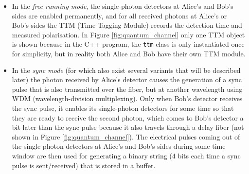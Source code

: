 \begin{itemize}

\item In the \textit{free running mode}, the single-photon detectors at Alice's and Bob's sides are enabled permanently, and for all received photons at Alice's or Bob's sides the TTM (Time Tagging Module) records the detection time and measured polarisation. In Figure \ref{fig:quantum_channel} only one TTM object is shown because in the C++ program, the \texttt{ttm} class is only instantiated once for simplicity, but in reality both Alice and Bob have their own TTM module.

\item In the \textit{sync mode} (for which also exist several variants that will be described later) the photon received by Alice's detector causes the generation of a sync pulse that is also transmitted over the fiber, but at another wavelength using WDM (wavelength-division multiplexing). Only when Bob's detector receives the sync pulse, it enables its single-photon detectors for some time so that they are ready to receive the second photon, which comes to Bob's detector a bit later than the sync pulse because it also travels through a delay fiber (not shown in Figure \ref{fig:quantum_channel}). The electrical pulses coming out of the single-photon detectors at Alice's and Bob's sides during some time window are then used for generating a binary string (4 bits each time a sync pulse is sent/received) that is stored in a buffer.

\end{itemize}